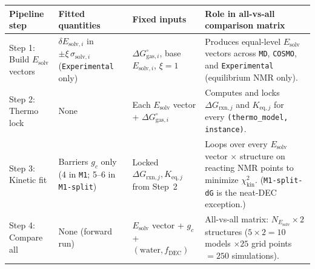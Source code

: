 \documentclass[11pt,a4paper]{article}
\begin{document}
\begin{table}[h!]
\centering
\small
\begin{tabularx}{\linewidth}{@{}L{3.2cm}L{3.2cm}L{3.4cm}Y@{}}
\toprule
\textbf{Pipeline step} & \textbf{Fitted quantities} & \textbf{Fixed inputs} & \textbf{Role in all-vs-all comparison matrix} \\
\midrule
Step 1: Build $E_{\text{solv}}$ vectors &
$\delta E_{\text{solv}, i}$ in $\pm \xi\,\sigma_{\text{solv}, i}$ (\texttt{Experimental} only) &
$\Delta G_{\text{gas}, i}^\circ$, base $E_{\text{solv}, i}$, $\xi = 1$ &
Produces equal-level $E_{\text{solv}}$ vectors across \texttt{MD}, \texttt{COSMO}, and \texttt{Experimental} (equilibrium NMR only). \\
\addlinespace
Step 2: Thermo lock &
None &
Each $E_{\text{solv}}$ vector + $\Delta G_{\text{gas}, i}^\circ$ &
Computes and locks $\Delta G_{\text{rxn}, j}$ and $K_{\text{eq}, j}$ for every \texttt{(thermo\_model, instance)}. \\
\addlinespace
Step 3: Kinetic fit &
Barriers $g_c$ only (4 in \texttt{M1}; 5--6 in \texttt{M1-split}) &
Locked $\Delta G_{\text{rxn}, j}, K_{\text{eq}, j}$ from Step~2 &
Loops over every $E_{\text{solv}}$ vector $\times$ structure on reacting NMR points to minimize $\chi^2_{\text{kin}}$. (\texttt{M1-split-dG} is the neat-DEC exception.) \\
\addlinespace
Step 4: Compare all &
None (forward run) &
$E_{\text{solv}}$ vector + $g_c$ + $(\text{water}, f_{\text{DEC}})$ &
All-vs-all matrix: $N_{E_{\text{solv}}} \times 2$ structures ($5 \times 2 = 10$ models $\times 25$ grid points $= 250$ simulations). \\
\bottomrule
\end{tabularx}
\end{table}
\end{document}

